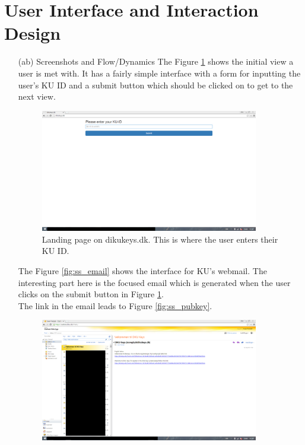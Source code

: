 \documentclass[11pt,a4paper]{report}
\begin{document}
\section{User Interface and Interaction Design}\label{sec:UI_interactiondesign}
\begin{enumerate}[label=(\alph*)]
\item[(ab)] Screenshots and Flow/Dynamics
The Figure \ref{fig:ss_kuid} shows the initial view a user is met with. It has a fairly simple interface with a form for inputting the user's KU ID and a submit button which should be clicked on to get to the next view. \\
\begin{figure}[H]
\centering
\includegraphics[width=0.9\textwidth]{pictures/screenshots/kuid}
\caption{Landing page on dikukeys.dk. This is where the user enters their KU ID.}
\label{fig:ss_kuid}
\end{figure}
The Figure \ref{fig:ss_email} shows the interface for KU's webmail. The interesting part here is the focused email which is generated when the user clicks on the submit button in Figure \ref{fig:ss_kuid}. \\
The link in the email leads to Figure \ref{fig:ss_pubkey}.\\
\begin{figure}[H]
\centering
\includegraphics[width=0.9\textwidth]{pictures/screenshots/email}

\end{figure}
\end{enumerate}
\end{document}

